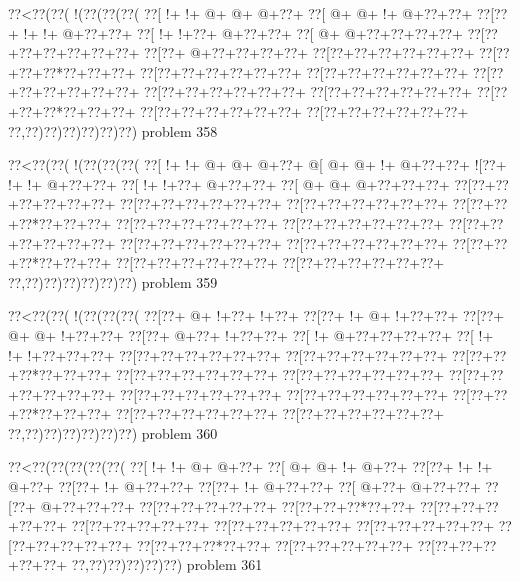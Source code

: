 \vbox{\vbox{\goo
\0??<\0??(\0??(\- !(\0??(\0??(\0??(
\0??[\- !+\- !+\- @+\- @+\- @+\0??+
\0??[\- @+\- @+\- !+\- @+\0??+\0??+
\0??[\0??+\- !+\- !+\- @+\0??+\0??+
\0??[\- !+\- !+\0??+\- @+\0??+\0??+
\0??[\- @+\- @+\0??+\0??+\0??+\0??+
\0??[\0??+\0??+\0??+\0??+\0??+\0??+
\0??[\0??+\- @+\0??+\0??+\0??+\0??+
\0??[\0??+\0??+\0??+\0??+\0??+\0??+
\0??[\0??+\0??+\0??*\0??+\0??+\0??+
\0??[\0??+\0??+\0??+\0??+\0??+\0??+
\0??[\0??+\0??+\0??+\0??+\0??+\0??+
\0??[\0??+\0??+\0??+\0??+\0??+\0??+
\0??[\0??+\0??+\0??+\0??+\0??+\0??+
\0??[\0??+\0??+\0??+\0??+\0??+\0??+
\0??[\0??+\0??+\0??*\0??+\0??+\0??+
\0??[\0??+\0??+\0??+\0??+\0??+\0??+
\0??[\0??+\0??+\0??+\0??+\0??+\0??+
\0??,\0??)\0??)\0??)\0??)\0??)\0??)
}
\hfil problem 358\hfil\break
}

\vbox{\vbox{\goo
\0??<\0??(\0??(\- !(\0??(\0??(\0??(
\0??[\- !+\- !+\- @+\- @+\- @+\0??+
\- @[\- @+\- @+\- !+\- @+\0??+\0??+
\- ![\0??+\- !+\- !+\- @+\0??+\0??+
\0??[\- !+\- !+\0??+\- @+\0??+\0??+
\0??[\- @+\- @+\- @+\0??+\0??+\0??+
\0??[\0??+\0??+\0??+\0??+\0??+\0??+
\0??[\0??+\0??+\0??+\0??+\0??+\0??+
\0??[\0??+\0??+\0??+\0??+\0??+\0??+
\0??[\0??+\0??+\0??*\0??+\0??+\0??+
\0??[\0??+\0??+\0??+\0??+\0??+\0??+
\0??[\0??+\0??+\0??+\0??+\0??+\0??+
\0??[\0??+\0??+\0??+\0??+\0??+\0??+
\0??[\0??+\0??+\0??+\0??+\0??+\0??+
\0??[\0??+\0??+\0??+\0??+\0??+\0??+
\0??[\0??+\0??+\0??*\0??+\0??+\0??+
\0??[\0??+\0??+\0??+\0??+\0??+\0??+
\0??[\0??+\0??+\0??+\0??+\0??+\0??+
\0??,\0??)\0??)\0??)\0??)\0??)\0??)
}
\hfil problem 359\hfil\break
}

\vbox{\vbox{\goo
\0??<\0??(\0??(\- !(\0??(\0??(\0??(
\0??[\0??+\- @+\- !+\0??+\- !+\0??+
\0??[\0??+\- !+\- @+\- !+\0??+\0??+
\0??[\0??+\- @+\- @+\- !+\0??+\0??+
\0??[\0??+\- @+\0??+\- !+\0??+\0??+
\0??[\- !+\- @+\0??+\0??+\0??+\0??+
\0??[\- !+\- !+\- !+\0??+\0??+\0??+
\0??[\0??+\0??+\0??+\0??+\0??+\0??+
\0??[\0??+\0??+\0??+\0??+\0??+\0??+
\0??[\0??+\0??+\0??*\0??+\0??+\0??+
\0??[\0??+\0??+\0??+\0??+\0??+\0??+
\0??[\0??+\0??+\0??+\0??+\0??+\0??+
\0??[\0??+\0??+\0??+\0??+\0??+\0??+
\0??[\0??+\0??+\0??+\0??+\0??+\0??+
\0??[\0??+\0??+\0??+\0??+\0??+\0??+
\0??[\0??+\0??+\0??*\0??+\0??+\0??+
\0??[\0??+\0??+\0??+\0??+\0??+\0??+
\0??[\0??+\0??+\0??+\0??+\0??+\0??+
\0??,\0??)\0??)\0??)\0??)\0??)\0??)
}
\hfil problem 360\hfil\break
}

\vbox{\vbox{\goo
\0??<\0??(\0??(\0??(\0??(\0??(
\0??[\- !+\- !+\- @+\- @+\0??+
\0??[\- @+\- @+\- !+\- @+\0??+
\0??[\0??+\- !+\- !+\- @+\0??+
\0??[\0??+\- !+\- @+\0??+\0??+
\0??[\0??+\- !+\- @+\0??+\0??+
\0??[\- @+\0??+\- @+\0??+\0??+
\0??[\0??+\- @+\0??+\0??+\0??+
\0??[\0??+\0??+\0??+\0??+\0??+
\0??[\0??+\0??+\0??*\0??+\0??+
\0??[\0??+\0??+\0??+\0??+\0??+
\0??[\0??+\0??+\0??+\0??+\0??+
\0??[\0??+\0??+\0??+\0??+\0??+
\0??[\0??+\0??+\0??+\0??+\0??+
\0??[\0??+\0??+\0??+\0??+\0??+
\0??[\0??+\0??+\0??*\0??+\0??+
\0??[\0??+\0??+\0??+\0??+\0??+
\0??[\0??+\0??+\0??+\0??+\0??+
\0??,\0??)\0??)\0??)\0??)\0??)
}
\hfil problem 361\hfil\break
}

